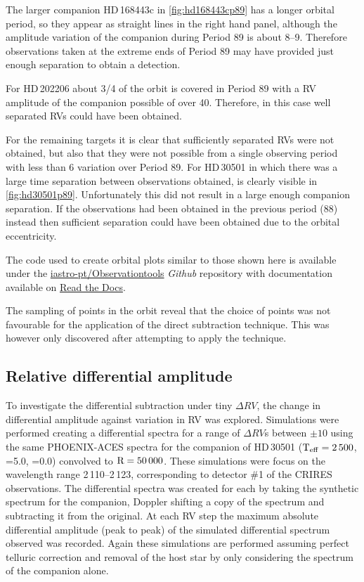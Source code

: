 The larger companion {HD\,168443}c in \cref{fig:hd168443cp89} has a longer orbital period, so they appear as straight lines in the right hand panel, although the amplitude variation of the companion during Period 89 is about 8--9\kmps.
Therefore observations taken at the extreme ends of Period 89 may have provided just enough separation to obtain a detection.

For HD\,202206 about 3/4 of the orbit is covered in Period 89 with a RV amplitude of the companion possible of over 40\kmps{}.
Therefore, in this case well separated RVs could have been obtained.

For the remaining targets it is clear that sufficiently separated RVs were not obtained, but also that they were not possible from a single observing period with less than 6\kmps{} variation over Period 89.
For HD\,30501 in which there was a large time separation between observations obtained, is clearly visible in \cref{fig:hd30501p89}.
Unfortunately this did not result in a large enough companion separation.
If the observations had been obtained in the previous period (88) instead then sufficient separation could have been obtained due to the orbital eccentricity.

The code used to create orbital plots similar to those shown here is available under the \href{https://github.com/iastro-pt/ObservationTools}{iastro-pt/Observationtools} \emph{Github} repository with documentation available on \href{https://ia-observationtools.readthedocs.io/en/latest/rv.html}{Read the Docs}.


The sampling of points in the orbit reveal that the choice of points was not favourable for the application of the direct subtraction technique.
This was however only discovered after attempting to apply the technique.




\subsection{Relative differential amplitude}
To investigate the differential subtraction under tiny \(\Delta RV\), the change in differential amplitude against variation in {RV} was explored.
Simulations were performed creating a differential spectra for a range of \(\Delta {RV}\)s between \(\pm10\)\kmps{} using the same {PHOENIX-ACES} spectra for the companion of {HD\,30501} (\(\textrm{T}_{\mathrm{eff}}{}=2\,500\)\K{}, \logg{}=5.0, \feh{}=0.0) convolved to \(\textrm{R}=50\,000\).
These simulations were focus on the wavelength range 2\,110--2\,123\nm{}, corresponding to detector \#1 of the {CRIRES} observations.
The differential spectra was created for each by taking the synthetic spectrum for the companion, Doppler shifting a copy of the spectrum and subtracting it from the original.
At each {RV} step the maximum absolute differential amplitude (peak to peak) of the simulated differential spectrum observed was recorded.
Again these simulations are performed assuming perfect telluric correction and removal of the host star by only considering the spectrum of the companion alone.

